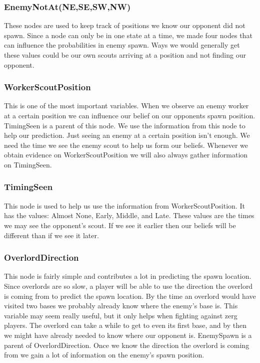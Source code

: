 \subsubsection*{EnemyNotAt(NE,SE,SW,NW)}
These nodes are used to keep track of positions we know our opponent did not spawn. Since a node can only be in one state at a time, we made four nodes that can influence the probabilities in enemy spawn. Ways we would generally get these values could be our own scouts arriving at a position and not finding our opponent.

\subsubsection*{WorkerScoutPosition} This is one of the most important variables. When we observe an enemy worker at a certain position we can influence our belief on our opponents spawn position. TimingSeen is a parent of this node. We use the information from this node to help our prediction. Just seeing an enemy at a certain position isn't enough. We need the time we see the enemy scout to help us form our beliefs. Whenever we obtain evidence on WorkerScoutPosition we will also always gather information on TimingSeen.

\subsubsection*{TimingSeen} This node is used to help us use the information from WorkerScoutPosition. It has the values: Almost None, Early, Middle, and Late. These values are the times we may see the opponent's scout. If we see it earlier then our beliefs will be different than if we see it later.


\subsubsection*{OverlordDirection} This node is fairly simple and contributes a lot in predicting the spawn location. Since overlords are so slow, a player will be able to use the direction the overlord is coming from to predict the spawn location. By the time an overlord would have visited two bases we probably already know where the enemy's base is. This variable may seem really useful, but it only helps when fighting against zerg players. The overlord can take a while to get to even its first base, and by then we might have already needed to know where our opponent is. EnemySpawn is a parent of OverlordDirection. Once we know the direction the overlord is coming from we gain a lot of information on the enemy's spawn position.

